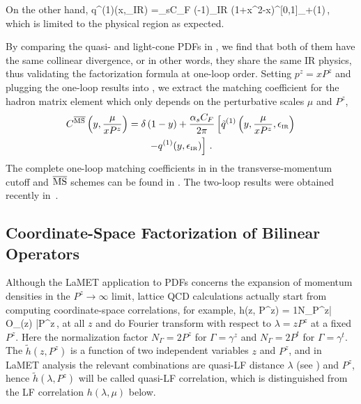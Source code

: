 On the other hand,
\beq\label{eq:lcpdf}
q^{(1)}(x,\epsilon_{\mbox{\tiny IR}}) ={\alpha_sC_F\pi} {(-1)\over \epsilon_{\mbox{\tiny IR}}} \left({1+x^2-x}\right)^{[0,1]}_{+(1)}\,,
\eeq
which is limited to the physical region as expected.

By comparing the quasi- and light-cone PDFs in , we find that both of them have the same collinear divergence,  or in other words, they share the same IR physics, thus validating the factorization formula at one-loop order. Setting $p^z=xP^z$ and plugging the one-loop results into , we extract the matching coefficient for the hadron matrix element which only depends on the perturbative scales $\mu$ and $P^z$,
\begin{align}\label{eq:msbarmatching}
	C^{{\overline{\rm MS}}}\left(y, {\mu\over xP^z}\right) &= \delta\left(1-y\right) + {\alpha_sC_F\over 2\pi}\left[\tilde q^{(1)}\left(y,{\mu\over xP^z}, \epsilon_{\mbox{\tiny IR}}\right)\right.\nonumber\\
	&\qquad\left.-q^{(1)}(y,\epsilon_{\mbox{\tiny IR}})\right]\,.
\end{align}
The complete one-loop matching coefficients in  in the transverse-momentum cutoff and ${\overline{\rm MS}}$ schemes can be found in \cite{Wang:2017qyg,Wang:2017eel,Wang:2019tgg}. The two-loop results were obtained recently in~\cite{Chen:2020arf,Chen:2020iqi,Chen:2020ody,Li:2020xml}.

\subsection{Coordinate-Space Factorization of Bilinear Operators}
\label{sec:renorm-coord}
Although the LaMET application to PDFs concerns the expansion of momentum densities
in the $P^z\to\infty$ limit, lattice QCD calculations actually start from
computing coordinate-space correlations, for example,
\beq
\tilde h(z, P^z) = {1\over N_\Gamma}\langle P^z| O_\Gamma(z) |P^z\rangle\,,
\eeq
at all $z$ and do Fourier transform with respect
to $\lambda=zP^z$ at a fixed $P^z$. Here the normalization factor $N_\Gamma=2P^z$ for $\Gamma=\gamma^z$ and $N_\Gamma=2P^t$ for $\Gamma=\gamma^t$.
The $\tilde h(z,P^z)$ is a function of two independent
variables $z$ and $P^z$, and in LaMET analysis the relevant
combinations are quasi-LF distance $\lambda$ (see ) and $P^z$, hence
$\tilde h(\lambda, P^z)$ will be called quasi-LF correlation, which is distinguished from the LF correlation $h(\lambda,\mu)$ below.

